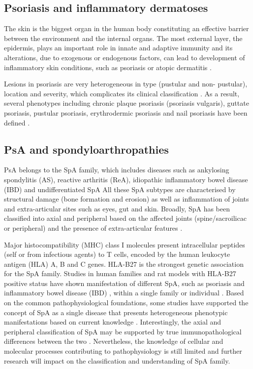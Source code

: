 \subsection{Psoriasis and inflammatory dermatoses}
%

The skin is the biggest organ in the human body constituting an effective barrier between the environment and the internal organs. The most external layer, the epidermis, plays an important role in innate and adaptive immunity and its alterations, due to exogenous or endogenous factors, can lead to development of inflammatory skin conditions, such as psoriasis or atopic dermatitis \parencite{Johnson-Huang2009, Proksch2008}.

Lesions in psoriasis are very heterogeneous in type (pustular and non- pustular), location and severity, which complicates its clinical classification \parencite{Perera2012}. As a result, several phenotypes  including chronic plaque psoriasis (psoriasis vulgaris), guttate psoriasis, pustular psoriasis, erythrodermic psoriasis and nail psoriasis have been defined \parencite{Marrakchi2011}.



\subsection{PsA and spondyloarthropathies}
%
PsA belongs to the SpA family, which includes diseases such as ankylosing spondylitis (AS), reactive arthritis (ReA), idiopathic inflammatory bowel disease (IBD) and undifferentiated SpA \parencite{Goldman2011} All these SpA subtypes are characterised by structural damage (bone formation and erosion) as well as inflammation of joints and extra-articular sites such as eyes, gut and skin. Broadly, SpA has been classified into axial and peripheral based on the affected joints (spine/sacroilicac or peripheral) and the presence of extra-articular features \parencite{Rudwaleit2009}.



Major histocompatibility (MHC) class I molecules present intracellular peptides (self or from infectious agents) to T cells, encoded by the human leukocyte antigen (HLA) A, B and C genes. HLA-B27 is the strongest genetic association for the SpA family. Studies in human families and rat models with HLA-B27 positive status have shown manifestation of different SpA, such as psoriasis and inflammatory bowel disease (IBD) , within a single family or individual \parencite{Hammer1990,Said-Nahal2001}. Based on the common pathophysiological foundations, some studies have supported the concept of SpA as a single disease that presents heterogeneous phenotypic manifestations   based on current knowledge \parencite{Baeten2013}. Interestingly, the axial and peripheral classification of SpA may be supported by true immunopathological differences between the two \parencite{Porcher2005, Appel2011, Vandooren2004}. Nevertheless, the knowledge of cellular and molecular processes contributing to pathophysiology is still limited and further research will impact on the classification and understanding of SpA family. 


